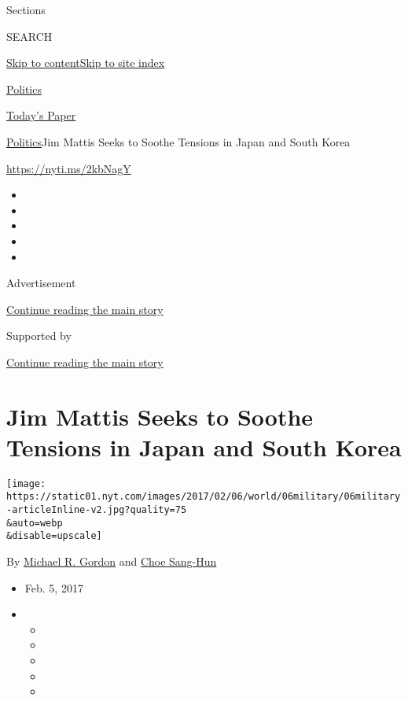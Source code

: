 Sections

SEARCH

\protect\hyperlink{site-content}{Skip to
content}\protect\hyperlink{site-index}{Skip to site index}

\href{https://www.nytimes.com/section/politics}{Politics}

\href{https://myaccount.nytimes.com/auth/login?response_type=cookie\&client_id=vi}{}

\href{https://www.nytimes.com/section/todayspaper}{Today's Paper}

\href{/section/politics}{Politics}\textbar{}Jim Mattis Seeks to Soothe
Tensions in Japan and South Korea

\url{https://nyti.ms/2kbNagY}

\begin{itemize}
\item
\item
\item
\item
\item
\end{itemize}

Advertisement

\protect\hyperlink{after-top}{Continue reading the main story}

Supported by

\protect\hyperlink{after-sponsor}{Continue reading the main story}

\hypertarget{jim-mattis-seeks-to-soothe-tensions-in-japan-and-south-korea}{%
\section{Jim Mattis Seeks to Soothe Tensions in Japan and South
Korea}\label{jim-mattis-seeks-to-soothe-tensions-in-japan-and-south-korea}}

\texttt{[image: https://static01.nyt.com/images/2017/02/06/world/06military/06military-articleInline-v2.jpg?quality=75\\\&auto=webp\\\&disable=upscale]}

By \href{http://www.nytimes.com/by/michael-r-gordon}{Michael R. Gordon}
and \href{http://www.nytimes.com/by/choe-sang-hun}{Choe Sang-Hun}

\begin{itemize}
\item
  Feb. 5, 2017
\item
  \begin{itemize}
  \item
  \item
  \item
  \item
  \item
  \end{itemize}
\end{itemize}

